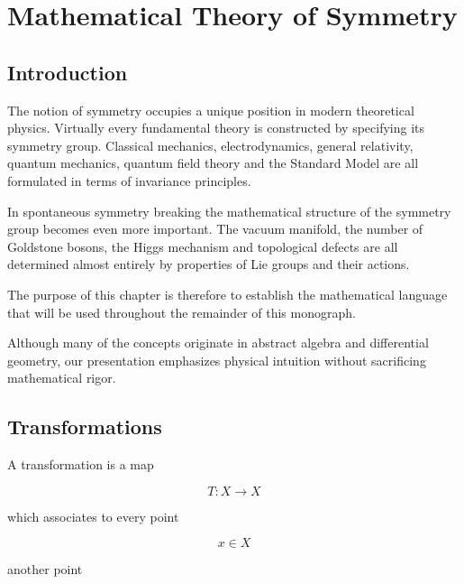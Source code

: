 %
%

\chapter{Mathematical Theory of Symmetry}

\label{chap:symmetry}


\section{Introduction}

The notion of symmetry occupies a unique position in modern theoretical
physics. Virtually every fundamental theory is constructed by specifying
its symmetry group. Classical mechanics, electrodynamics, general
relativity, quantum mechanics, quantum field theory and the Standard
Model are all formulated in terms of invariance principles.

In spontaneous symmetry breaking the mathematical structure of the
symmetry group becomes even more important. The vacuum manifold, the
number of Goldstone bosons, the Higgs mechanism and topological defects
are all determined almost entirely by properties of Lie groups and their
actions.

The purpose of this chapter is therefore to establish the mathematical
language that will be used throughout the remainder of this monograph.

Although many of the concepts originate in abstract algebra and
differential geometry, our presentation emphasizes physical intuition
without sacrificing mathematical rigor.


\section{Transformations}

A transformation is a map

\[
T:X\rightarrow X
\]

which associates to every point

\[
x\in X
\]

another point

